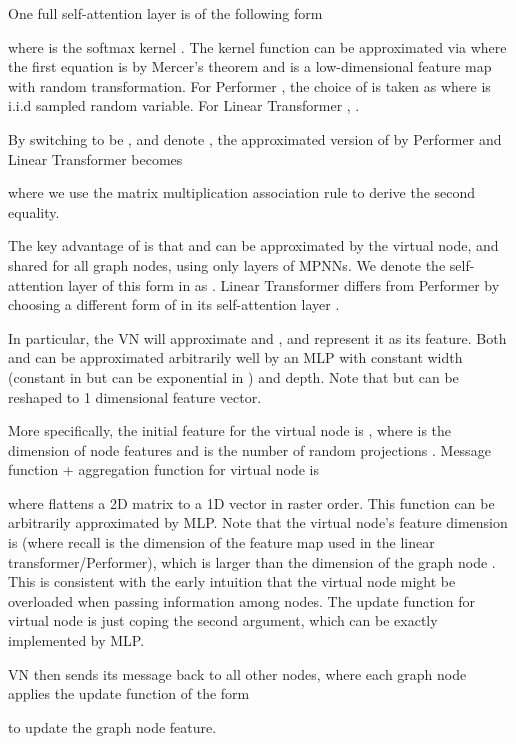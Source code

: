 \documentclass[nohyperref]{article}
\theoremstyle{plain}
\theoremstyle{definition}
\theoremstyle{remark}
\begin{document}
One full self-attention layer  is of the following form


where  is the softmax kernel . The kernel function can be approximated via  where the first equation is by Mercer's theorem and  is a low-dimensional feature map with random transformation. For Performer \citep{choromanski2020rethinking}, the choice of  is taken as  where  is i.i.d sampled random variable. For Linear Transformer \citep{katharopoulos2020transformers}, . 

By switching  to be , and denote , the approximated version of  by Performer and Linear Transformer becomes 

where we use the matrix multiplication association rule to derive the second equality. 

The key advantage of  is that  and  can be approximated by the virtual node, and shared for all graph nodes, using only  layers of MPNNs.  
We denote the self-attention layer of this form in  as . Linear Transformer differs from Performer by choosing a different form of  in its self-attention layer .  

In particular, the VN will approximate  and , and represent it as its feature. Both  and  can be approximated arbitrarily well by an MLP with constant width (constant in  but can be exponential in ) and depth. Note that  but can be reshaped to 1 dimensional feature vector.

More specifically, the initial feature for the virtual node is , where  is the dimension of node features and  is the number of random projections .  
Message function + aggregation function for virtual node 
 is

 where  flattens a 2D matrix to a 1D vector in raster order. This function can be arbitrarily approximated  by MLP. Note that the virtual node's feature dimension is  (where recall  is the dimension of the feature map  used in the linear transformer/Performer), which is larger than the dimension of the graph node . This is consistent with the early intuition that the virtual node might be overloaded when passing information among nodes. The update function for virtual node   is just coping the second argument, which can be exactly implemented by MLP. 

VN then sends its message back to all other nodes, where each graph node  applies the update function  of the form

 to update the graph node feature. 
\end{document}
